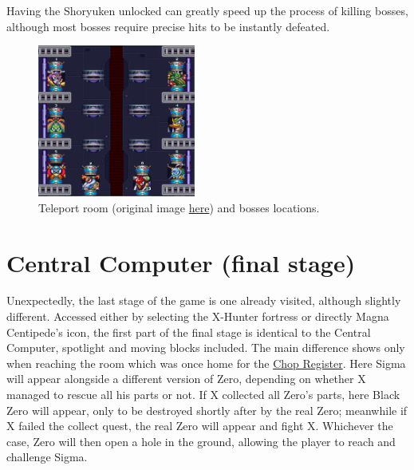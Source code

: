 Having the Shoryuken unlocked can greatly speed up the process of killing bosses, although most bosses require precise hits to be instantly defeated.
\begin{figure}[htp]
	\centering
	\includegraphics[height=5cm]{figures/X2/Hunter_stages/map-4.png}
	\caption[Teleport room and boss location]{Teleport room (original image \href{https://vgmaps.com/Atlas/SuperNES/MegaManX2-X-HunterBase-Stage4.png}{here}) and bosses locations.}
	\label{fig:teleport_room}
\end{figure}

\section{Central Computer (final stage)}

Unexpectedly, the last stage of the game is one already visited, although slightly different. Accessed either by selecting the X-Hunter fortress or directly Magna Centipede's icon, the first part of the final stage is identical to the Central Computer, spotlight and moving blocks included. The main difference shows only when reaching the room which was once home for the \hyperlink{miniboss:Chop_Register}{Chop Register}. Here Sigma will appear alongside a different version of Zero, depending on whether X managed to rescue all his parts or not. If X collected all Zero's parts, here Black Zero will appear, only to be destroyed shortly after by the real Zero; meanwhile if X failed the collect quest, the real Zero will appear and fight X. Whichever the case, Zero will then open a hole in the ground, allowing the player to reach and challenge Sigma. 

